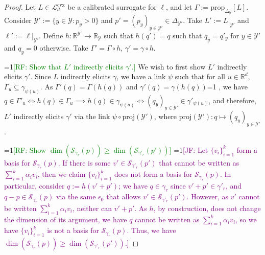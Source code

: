 \documentclass[11pt]{article} %
\newcommand{\Comments}{1}
\newcommand{\mynote}[2]{\ifnum\Comments=1\textcolor{#1}{#2}\fi}
\newcommand{\mytodo}[2]{\ifnum\Comments=1%
	\todo[linecolor=#1!80!black,backgroundcolor=#1,bordercolor=#1!80!black]{#2}\fi}
\newcommand{\raf}[1]{\mynote{green}{[RF: #1]}}
\newcommand{\jessie}[1]{\mynote{purple}{[JF: #1]}}
\newcommand{\jessiet}[1]{\mytodo{purple!20!white}{JF: #1}}
\newcommand{\reals}{\mathbb{R}}
\newcommand{\simplex}{\Delta_\Y}
\newcommand{\prop}[2][\mathcal{P}]{\mathrm{prop}_{#1}[#2]}
\newcommand{\proj}{\mathrm{proj}}
\newcommand{\Lcvx}{\mathcal{L}^{\mathrm{cvx}}}
\newcommand{\Sc}{\mathcal{S}}  %
\newcommand{\Y}{\mathcal{Y}}
\begin{document}
\hariresult*
\begin{proof}
  Let $L \in \Lcvx_d$ be a calibrated surrogate for $\ell$, and let $\Gamma := \prop[\simplex]{L}$.
  Consider $\Y' := \{y\in\Y : p_y > 0\}$ and $p' = (p_y)_{y\in\Y'} \in \Delta_{\Y'}$.
  Take $L' := L|_{\Y'}$ and $\ell' := \ell|_{\Y'}$.
  Define $h:\reals^{\Y'} \to \reals_\Y$ such that $h(q') = q$ such that $q_y = q'_y$ for $y\in\Y'$ and $q_y = 0$ otherwise.
  Take $\Gamma' = \Gamma \circ h$, $\gamma' = \gamma \circ h$.
  
  \raf{Show that $L'$ indirectly elicits $\gamma'$.}
  We wish to first  show $L'$ indirectly elicits $\gamma'$.
  Since $L$ indirectly elicits $\gamma$, we have a link $\psi$ such that for all $u \in \reals^d$, $\Gamma_u \subseteq \gamma_{\psi(u)}$.
  As $\Gamma'(q) = \Gamma(h(q))$ and $\gamma'(q) = \gamma(h(q))$\jessiet{Hand waving}, we have $q \in \Gamma'_u \iff h(q) \in \Gamma_u \implies h(q) \in \gamma_{\psi(u)} \iff (q_y)_{y \in \Y'} \in \gamma'_{\psi(u)}$, and therefore, $L'$ indirectly elicits $\gamma'$ via the link $\psi \circ \proj(\Y')$, where $\proj(\Y') : q \mapsto (q_y)_{y \in \Y'}$. 

  \raf{Show $\dim(\Sc_{\gamma_r}(p)) \geq \dim(\Sc_{\gamma'_r}(p'))$}
\jessie{  Let $\{v_i\}_{i=1}^k$ form a basis for $\Sc_{\gamma_r}(p)$.
  If there is some $v' \in \Sc_{\gamma'_r}(p')$ that cannot be written as $\sum_{i=1}^k \alpha_i v_i$, then we claim $\{v_i\}_{i=1}^k$ does not form a basis for $\Sc_{\gamma_r}(p)$.
  In particular, consider $q := h(v' + p')$; we have $q \in \gamma_r$ since $v' + p' \in \gamma'_r$, and $q - p \in \Sc_{\gamma_r}(p)$ via the same $\epsilon_0$ that allows $v' \in \Sc_{\gamma'_r}(p')$.
  However, as $v'$ cannot be written $\sum_{i=1}^k \alpha_i v_i$, neither can $v' + p'$.
  As $h$, by construction, does not change the dimension of its argument, we have $q$ cannot be written as $\sum_{i=1}^k \alpha_i v_i$, so we have $\{v_i\}_{i=1}^k$ is not a basis for $\Sc_{\gamma_r}(p)$.
  Thus, we have $\dim(\Sc_{\gamma_r}(p)) \geq \dim(\Sc_{\gamma'_r}(p'))$.}
  

\end{proof}
\end{document}
